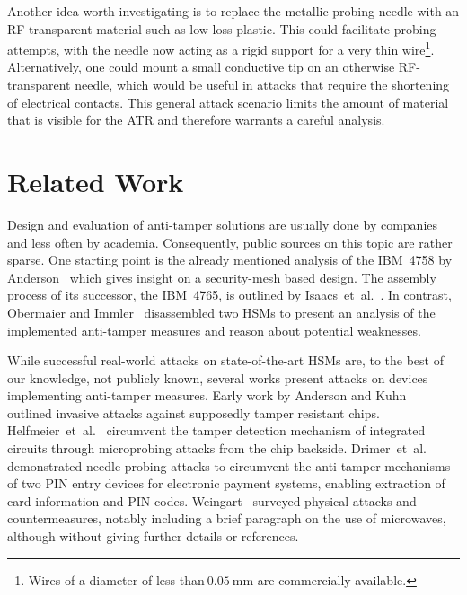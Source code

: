 \documentclass[conference]{IEEEtran}
\makeatletter
\newcommand{\etal}{et~al.\@\xspace}
\makeatother
\begin{document}
Another idea worth investigating is to replace the metallic probing needle with an RF-transparent material such as low-loss plastic. 
This could facilitate probing attempts, with the needle now acting as a rigid support for a very thin wire\footnote{Wires of a diameter of less than$~\SI{0.05}{\mm}$ are commercially available.}. Alternatively, one could mount a small conductive tip on an otherwise RF-transparent needle, which would be useful in attacks that require the shortening of electrical contacts. This general attack scenario limits the amount of material that is visible for the ATR and therefore warrants a careful analysis.





















 
\section{Related Work}
Design and evaluation of anti-tamper solutions are usually done by companies and less often by academia. Consequently, public sources on this topic are rather sparse. 
One starting point is the already mentioned analysis of the IBM~4758 by Anderson~\cite{andersonSecEngineering} which gives insight on a security-mesh based design. The assembly process of its successor, the IBM~4765, is outlined by Isaacs~\etal~\cite{isaacs2013tamper}. In contrast,  Obermaier and Immler~\cite{obermaierPresentFuturePhysical2018} disassembled two HSMs to present an analysis of the implemented anti-tamper measures and reason about potential weaknesses. 

While successful real-world attacks on state-of-the-art HSMs are, to the best of our knowledge, not publicly known, several works present attacks on devices implementing anti-tamper measures. Early work by Anderson and Kuhn~\cite{andersonTamperCaution1996} outlined invasive attacks against supposedly tamper resistant chips. Helfmeier~\etal~\cite{helfmeierBreakingEnteringSilicon2013} circumvent the tamper detection mechanism of integrated circuits through microprobing attacks from the chip backside. Drimer~\etal~\cite{drimerThinkingBoxSystemLevel2008} demonstrated needle probing attacks to circumvent the anti-tamper mechanisms of two PIN entry devices for electronic payment systems, enabling extraction of card information and PIN codes. Weingart~\cite{weingartPhysicalSecurityDevices2000a} surveyed physical attacks and countermeasures, notably including a brief paragraph on the use of microwaves, although without giving further details or references. 
\end{document}
